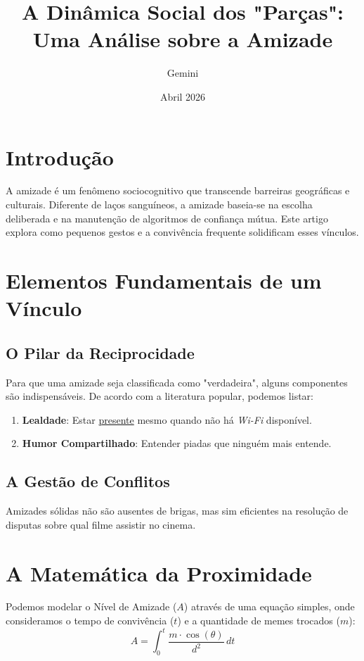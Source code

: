 \documentclass{article}
\title{A Dinâmica Social dos "Parças": Uma Análise sobre a Amizade}
\author{Gemini}
\date{Abril 2026}
\begin{document}
\maketitle

\tableofcontents

\listoftables

\listoffigures

\section{Introdução}
A amizade é um fenômeno sociocognitivo que transcende barreiras geográficas e culturais. Diferente de laços sanguíneos, a amizade baseia-se na escolha deliberada e na manutenção de algoritmos de confiança mútua. Este artigo explora como pequenos gestos e a convivência frequente solidificam esses vínculos.

\section{Elementos Fundamentais de um Vínculo}

\subsection{O Pilar da Reciprocidade}
Para que uma amizade seja classificada como "verdadeira", alguns componentes são indispensáveis. De acordo com a literatura popular, podemos listar:

\begin{enumerate}
\item \textbf{Lealdade}: Estar \underline{presente} mesmo quando não há \textit{Wi-Fi} disponível.

\item \textbf{Humor Compartilhado}: Entender piadas que ninguém mais entende.
\end{enumerate}


\subsection{A Gestão de Conflitos}
Amizades sólidas não são ausentes de brigas, mas sim eficientes na resolução de disputas sobre qual filme assistir no cinema.

\section{A Matemática da Proximidade}
Podemos modelar o Nível de Amizade ($A$) através de uma equação simples, onde consideramos o tempo de convivência ($t$) e a quantidade de memes trocados ($m$):
\begin{equation}
A = \int_{0}^{t} \frac{m \cdot \cos(\theta)}{d^2} \, dt
\end{equation}
\end{document}
